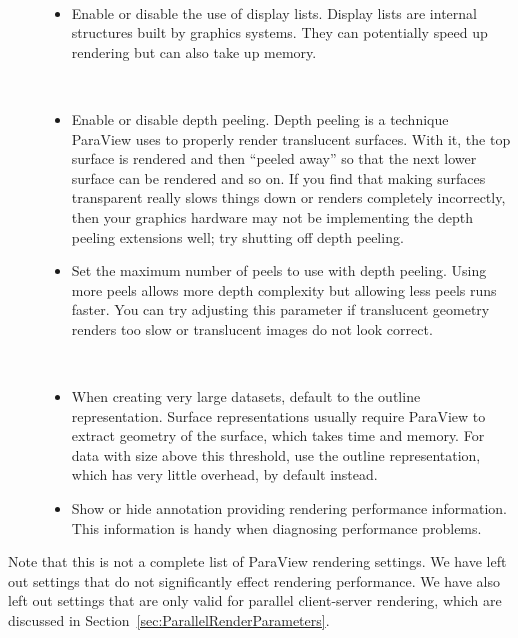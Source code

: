 \begin{description}
\item[]~
  \begin{itemize}
  \item {}  Enable or
    disable the use of display lists. Display lists are internal structures
    built by graphics systems. They can potentially speed up rendering but
    can also take up memory.
  \end{itemize}
\item[]~
  \begin{itemize}
  \item {} Enable or disable depth peeling. Depth
    peeling is a technique ParaView uses to properly render translucent
    surfaces. With it, the top surface is rendered and then ``peeled away''
    so that the next lower surface can be rendered and so on.  If you find
    that making surfaces transparent really slows things down or renders
    completely incorrectly, then your graphics hardware may not be
    implementing the depth peeling extensions well; try shutting off depth
    peeling. 
  \item Set the maximum number of peels to use with depth peeling. Using
    more peels allows more depth complexity but allowing less peels runs
    faster. You can try adjusting this parameter if translucent geometry
    renders too slow or translucent images do not look correct.
  \end{itemize}
\item[]~
  \begin{itemize}
  \item When creating very large datasets, default to the outline
    representation. Surface representations usually require ParaView to
    extract geometry of the surface, which takes time and memory. For data
    with size above this threshold, use the outline representation, which
    has very little overhead, by default instead.
  \item {} Show or hide annotation providing
    rendering performance information. This information is handy when
    diagnosing performance problems. 
  \end{itemize}
\end{description}

Note that this is not a complete list of ParaView rendering settings. We
have left out settings that do not significantly effect rendering
performance. We have also left out settings that are only valid for
parallel client-server rendering, which are discussed in
Section~\ref{sec:ParallelRenderParameters}.


